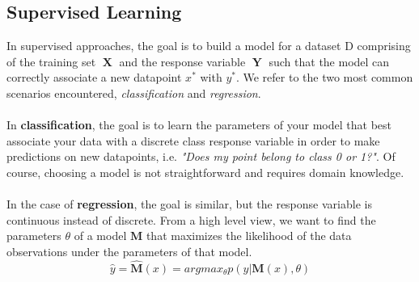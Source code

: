 \documentclass[a4paper]{article}
\DeclareMathOperator{\boldX}{\textbf{X}}
\DeclareMathOperator{\boldY}{\textbf{Y}}
\begin{document}
\subsection{Supervised Learning}
In supervised approaches, the goal is to build a model for a dataset D comprising of the training set $\boldX$ and the response variable $\boldY$ such that the model can correctly associate a new datapoint $x^*$ with $y^*$. We refer to the two most common scenarios encountered, \textit{classification} and \textit{regression}.\\
\\
In \textbf{classification}, the goal is to learn the parameters of your model that best associate your data with a discrete class response variable in order to make predictions on new datapoints, i.e. \textit{"Does my point belong to class 0 or 1?"}. Of course, choosing a model is not straightforward and requires domain knowledge.\\
\\
In the case of \textbf{regression}, the goal is similar, but the response variable is continuous instead of discrete. From a high level view, we want to find the parameters $\theta$ of a model $\textbf{M}$ that maximizes the likelihood of the data observations under the parameters of that model. 
\begin{equation}\label{supervised_master_equation}
\hat{y} = \hat{\textbf{M}}(x) = argmax_{\theta} p(y|\textbf{M}(x),\theta)
\end{equation}
 
\end{document}
